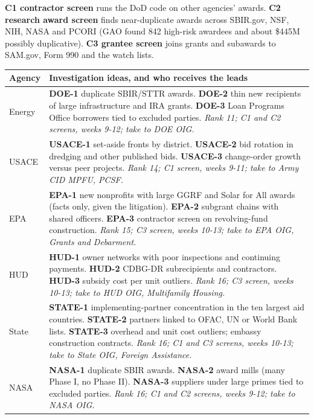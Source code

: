 \documentclass[letterpaper,11pt]{article}
\begin{document}
\textbf{C1 contractor screen} runs the DoD code on other agencies'
awards. \textbf{C2 research award screen} finds near-duplicate awards
across SBIR.gov, NSF, NIH, NASA and PCORI (GAO found 842 high-risk
awardees and about \$445M possibly duplicative). \textbf{C3 grantee
screen} joins grants and subawards to SAM.gov, Form 990 and the watch
lists.

\begingroup\small\setlength{\tabcolsep}{4pt}\renewcommand{\arraystretch}{1.25}
\begin{longtable}[l]{@{}l>{\raggedright\arraybackslash}p{}@{}}
\rowcolor{coolblack}\leavevmode\color{white}\bfseries Agency & \leavevmode\color{white}\bfseries Investigation ideas, and who receives the leads \\
\endhead
Energy & \textbf{DOE-1} duplicate SBIR/STTR awards. \textbf{DOE-2} thin new recipients of large infrastructure and IRA grants. \textbf{DOE-3} Loan Programs Office borrowers tied to excluded parties. \emph{Rank 11; C1 and C2 screens, weeks 9-12; take to DOE OIG.} \\
USACE & \textbf{USACE-1} set-aside fronts by district. \textbf{USACE-2} bid rotation in dredging and other published bids. \textbf{USACE-3} change-order growth versus peer projects. \emph{Rank 14; C1 screen, weeks 9-11; take to Army CID MPFU, PCSF.} \\
EPA & \textbf{EPA-1} new nonprofits with large GGRF and Solar for All awards (facts only, given the litigation). \textbf{EPA-2} subgrant chains with shared officers. \textbf{EPA-3} contractor screen on revolving-fund construction. \emph{Rank 15; C3 screen, weeks 10-13; take to EPA OIG, Grants and Debarment.} \\
HUD & \textbf{HUD-1} owner networks with poor inspections and continuing payments. \textbf{HUD-2} CDBG-DR subrecipients and contractors. \textbf{HUD-3} subsidy cost per unit outliers. \emph{Rank 16; C3 screen, weeks 10-13; take to HUD OIG, Multifamily Housing.} \\
State & \textbf{STATE-1} implementing-partner concentration in the ten largest aid countries. \textbf{STATE-2} partners linked to OFAC, UN or World Bank lists. \textbf{STATE-3} overhead and unit cost outliers; embassy construction contracts. \emph{Rank 16; C1 and C3 screens, weeks 10-13; take to State OIG, Foreign Assistance.} \\
NASA & \textbf{NASA-1} duplicate SBIR awards. \textbf{NASA-2} award mills (many Phase I, no Phase II). \textbf{NASA-3} suppliers under large primes tied to excluded parties. \emph{Rank 16; C1 and C2 screens, weeks 9-12; take to NASA OIG.} \\

\end{longtable}
\end{document}
